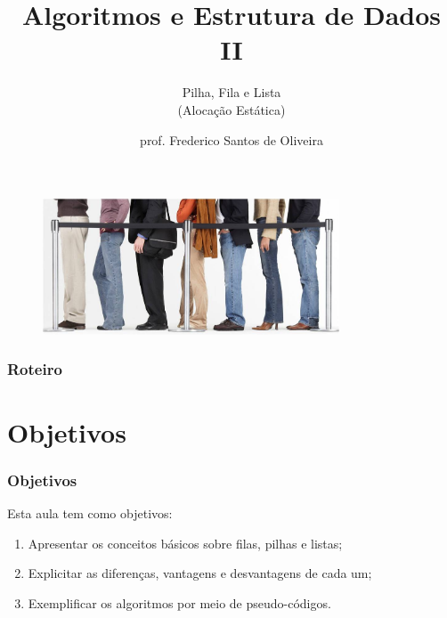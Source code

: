 \documentclass[aspectratio=169]{beamer}
\title[Pilha, Fila e Lista]{Algoritmos e Estrutura de Dados II}
\subtitle{Pilha, Fila e Lista\\(Alocação Estática)}
\author[Frederico Santos de Oliveira]{prof. Frederico Santos de Oliveira}
\institute[UFMT]{Universidade Federal de Mato Grosso\\ Instituto de Engenharia}
\date{}
\begin{document}
\begin{frame}
\titlepage %

\begin{figure}[!h]
  \centering
  \includegraphics[width=250pt]{imgs/introducao.jpg}
  \label{fig_introducao}
\end{figure}
\end{frame}


\begin{frame}
\frametitle{Roteiro} %
\tableofcontents %
\end{frame}


\section{Objetivos}

\begin{frame}
\frametitle{Objetivos}

Esta aula tem como objetivos:

\begin{enumerate}
\item Apresentar os conceitos básicos sobre filas, pilhas e listas;
\item Explicitar as diferenças, vantagens e desvantagens de cada um;
\item Exemplificar os algoritmos por meio de pseudo-códigos.
\end{enumerate}

\end{frame}
\end{document}
